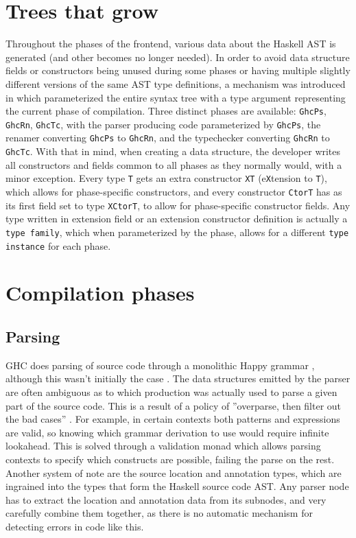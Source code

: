 \documentclass[en]{pracamgr}
\begin{document}
\section{Trees that grow}\label{ttg}
Throughout the phases of the frontend, various data about the Haskell AST is generated (and other becomes no longer needed).
In order to avoid data structure fields or constructors being unused during some phases or having multiple slightly different versions of the same AST type definitions,
a mechanism was introduced in \cite{Najd2017TreesTG} which parameterized the entire syntax tree with a type argument representing the current phase of compilation.
Three distinct phases are available: \texttt{GhcPs}, \texttt{GhcRn}, \texttt{GhcTc},
with the parser producing code parameterized by \texttt{GhcPs}, the renamer converting \texttt{GhcPs} to \texttt{GhcRn},
and the typechecker converting \texttt{GhcRn} to \texttt{GhcTc}. 
With that in mind, when creating a data structure,
the developer writes all constructors and fields common to all phases as they normally would, with a minor exception.
Every type \texttt{T} gets an extra constructor \texttt{XT} (e\texttt{X}tension to \texttt{T}), which allows for phase-specific constructors,
and every constructor \texttt{CtorT} has as its first field set to type \texttt{XCtorT}, to allow for phase-specific constructor fields.
Any type written in extension field or an extension constructor definition is actually a \texttt{type family},
which when parameterized by the phase, allows for a different \texttt{type instance} for each phase.
\section{Compilation phases}
\subsection{Parsing}
GHC does parsing of source code through a monolithic Happy grammar \cite{Happy}, although this wasn't initially the case \cite{Jones1993TheGH}.
The data structures emitted by the parser are often ambiguous as to which production was actually used to parse a given part of the source code.
This is a result of a policy of ''overparse, then filter out the bad cases'' \cite{ParserWiki}.
For example, in certain contexts both patterns and expressions are valid, so knowing which grammar derivation to use would require infinite lookahead.
This is solved through a validation monad which allows parsing contexts to specify which constructs are possible, failing the parse on the rest.
Another system of note are the source location and annotation types, which are ingrained into the types that form the Haskell source code AST.
Any parser node has to extract the location and annotation data from its subnodes, and very carefully combine them together,
as there is no automatic mechanism for detecting errors in code like this.
\end{document}
